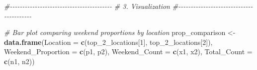 \documentclass[
  12pt,
]{article}
\newenvironment{Shaded}{\begin{snugshade}}{\end{snugshade}}
\newcommand{\AttributeTok}[1]{\textcolor[rgb]{0.13,0.29,0.53}{#1}}
\newcommand{\CommentTok}[1]{\textcolor[rgb]{0.56,0.35,0.01}{\textit{#1}}}
\newcommand{\DecValTok}[1]{\textcolor[rgb]{0.00,0.00,0.81}{#1}}
\newcommand{\FunctionTok}[1]{\textcolor[rgb]{0.13,0.29,0.53}{\textbf{#1}}}
\newcommand{\NormalTok}[1]{#1}
\newcommand{\OtherTok}[1]{\textcolor[rgb]{0.56,0.35,0.01}{#1}}
\begin{document}
\begin{Shaded}
\begin{Highlighting}[]
\CommentTok{\#{-}{-}{-}{-}{-}{-}{-}{-}{-}{-}{-}{-}{-}{-}{-}{-}{-}{-}{-}{-}{-}{-}{-}{-}{-}{-}{-}{-}{-}{-}{-}{-}{-}{-}{-}{-}{-}{-}{-}{-}{-}}
\CommentTok{\# 3. Visualization}
\CommentTok{\#{-}{-}{-}{-}{-}{-}{-}{-}{-}{-}{-}{-}{-}{-}{-}{-}{-}{-}{-}{-}{-}{-}{-}{-}{-}{-}{-}{-}{-}{-}{-}{-}{-}{-}{-}{-}{-}{-}{-}{-}{-}}

\CommentTok{\# Bar plot comparing weekend proportions by location}
\NormalTok{prop\_comparison }\OtherTok{\textless{}{-}} \FunctionTok{data.frame}\NormalTok{(}\AttributeTok{Location =} \FunctionTok{c}\NormalTok{(top\_2\_locations[}\DecValTok{1}\NormalTok{],}
\NormalTok{    top\_2\_locations[}\DecValTok{2}\NormalTok{]), }\AttributeTok{Weekend\_Proportion =} \FunctionTok{c}\NormalTok{(p1, p2), }\AttributeTok{Weekend\_Count =} \FunctionTok{c}\NormalTok{(x1,}
\NormalTok{    x2), }\AttributeTok{Total\_Count =} \FunctionTok{c}\NormalTok{(n1, n2))}


\end{Highlighting}
\end{Shaded}
\end{document}
